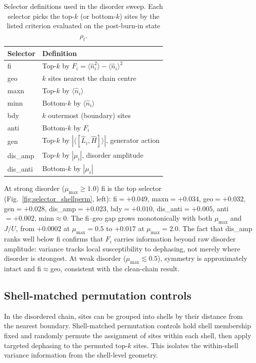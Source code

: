 \documentclass[aps,pra,reprint,amsmath,amssymb,longbibliography,floatfix]{revtex4-2}
\newcommand{\Fi}{F_i}
\newcommand{\nop}{\hat{n}}
\begin{document}
\begin{table}[tbp]
\centering
\caption{Selector definitions used in the disorder sweep.
Each selector picks the top-$k$ (or bottom-$k$) sites by the listed
criterion evaluated on the post-burn-in state $\rho_t$.}
\label{tab:selectors}
\begin{ruledtabular}
\begin{tabular}{ll}
Selector & Definition \\
\hline
fi        & Top-$k$ by $\Fi=\langle\nop_i^2\rangle-\langle\nop_i\rangle^2$ \\
geo       & $k$ sites nearest the chain centre \\
maxn      & Top-$k$ by $\langle\nop_i\rangle$ \\
minn      & Bottom-$k$ by $\langle\nop_i\rangle$ \\
bdy       & $k$ outermost (boundary) sites \\
anti      & Bottom-$k$ by $\Fi$ \\
gen       & Top-$k$ by $|\langle[\hat{L}_i,\hat{H}]\rangle|$, generator action \\
dis\_amp  & Top-$k$ by $|\mu_i|$, disorder amplitude \\
dis\_anti & Bottom-$k$ by $|\mu_i|$ \\
\end{tabular}
\end{ruledtabular}
\end{table}

At strong disorder ($\mu_{\max}\geq1.0$) fi is the top selector
(Fig.~\ref{fig:selector_shellperm}, left):
fi$=+0.049$, maxn$=+0.034$, geo$=+0.032$, gen$=+0.028$,
dis\_amp$=+0.023$, bdy$=+0.010$, dis\_anti$=+0.005$, anti$=+0.002$,
minn$\approx0$.
The fi--geo gap grows monotonically with both $\mu_{\max}$ and $J/U$,
from $+0.0002$ at $\mu_{\max}=0.5$ to $+0.017$ at $\mu_{\max}=2.0$.
The fact that dis\_amp ranks well below fi confirms that $\Fi$ carries
information beyond raw disorder amplitude: variance tracks local
susceptibility to dephasing, not merely where disorder is strongest.
At weak disorder ($\mu_{\max}\lesssim0.5$), symmetry is approximately intact
and fi$\approx$geo, consistent with the clean-chain result.

\subsection{Shell-matched permutation controls}
\label{sec:shellperm}

In the disordered chain, sites can be grouped into shells by their
distance from the nearest boundary.
Shell-matched permutation controls hold shell membership fixed and randomly
permute the assignment of sites within each shell, then apply targeted
dephasing to the permuted top-$k$ sites.
This isolates the within-shell variance information from the shell-level
geometry.
\end{document}
